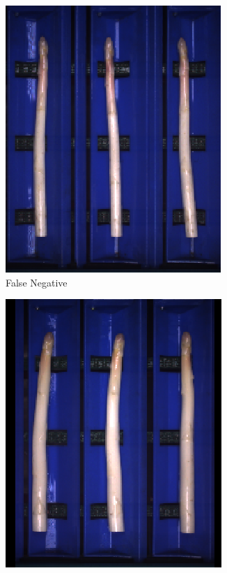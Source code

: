 \begin{figure}[h]
	\centering
	\begin{subfigure}{0.3\textwidth}
		\includegraphics[width=0.9\linewidth]{Figures/appendix/flower_falsenegative_01.png}
		\vspace{-5pt} 
		\caption{False Negative}
	\end{subfigure}
	\begin{subfigure}{0.3\textwidth}
		\includegraphics[width=0.9\linewidth]{Figures/appendix/flower_falsenegative_02.png}

\end{subfigure}
\end{figure}
